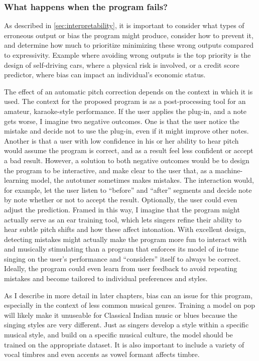 \subsubsection{What happens when the program fails?}
As described in \ref{sec:interpretability}, it is important to consider what types of erroneous output or bias the program might produce, consider how to prevent it, and determine how much to prioritize minimizing these wrong outputs compared to expressivity. Example where avoiding wrong outputs is the top priority is the design of self-driving cars, where a physical risk is involved, or a credit score predictor, where bias can impact an individual's economic status. 

The effect of an automatic pitch correction depends on the context in which it is used. The context for the proposed program is as a post-processing tool for an amateur, karaoke-style performance. If the user applies the plug-in, and a note gets worse, I imagine two negative outcomes. One is that the user notice the mistake and decide not to use the plug-in, even if it might improve other notes. Another is that a user with low confidence in his or her ability to hear pitch would assume the program is correct, and as a result feel less confident or accept a bad result. However, a solution to both negative outcomes would be to design the program to be interactive, and make clear to the user that, as a machine-learning model, the autotuner sometimes makes mistakes. The interaction would, for example, let the user listen to ``before'' and ``after'' segments and decide note by note whether or not to accept the result. Optionally, the user could even adjust the prediction. Framed in this way, I imagine that the program might actually serve as an ear training tool, which lets singers refine their ability to hear subtle pitch shifts and how these affect intonation. With excellent design, detecting mistakes might actually make the program more fun to interact with and musically stimulating than a program that enforces its model of in-tune singing on the user's performance and ``considers'' itself to always be correct. Ideally, the program could even learn from user feedback to avoid repeating mistakes and become tailored to individual preferences and styles.

As I describe in more detail in later chapters, bias can an issue for this program, especially in the context of less common musical genres. Training a model on pop will likely make it unuseable for Classical Indian music or blues because the singing styles are very different. Just as singers develop a style within a specific musical style, and build on a specific musical culture, the model should be trained on the appropriate dataset. It is also important to include a variety of vocal timbres and even accents as vowel formant affects timbre. 

